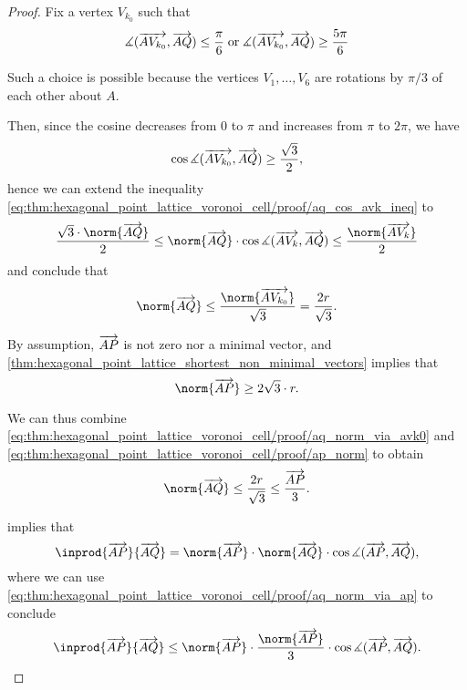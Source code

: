 \begin{proof}
  Fix a vertex \( V_{k_0} \) such that
  \begin{equation*}
    \measuredangle(\vect{AV_{k_0}}, \vect{AQ}) \leq \frac \pi 6 \T{or} \measuredangle(\vect{AV_{k_0}}, \vect{AQ}) \geq \frac {5\pi} 6
  \end{equation*}

  Such a choice is possible because the vertices \( V_1, \ldots, V_6 \) are rotations by \( \pi / 3 \) of each other about \( A \).

  Then, since the cosine decreases from \( 0 \) to \( \pi \) and increases from \( \pi \) to \( 2\pi \), we have
  \begin{equation*}
    \cos \measuredangle(\overrightarrow{AV_{k_0}}, \overrightarrow{AQ}) \geq \frac {\sqrt 3} 2,
  \end{equation*}
  hence we can extend the inequality \eqref{eq:thm:hexagonal_point_lattice_voronoi_cell/proof/aq_cos_avk_ineq} to
  \begin{equation*}
    \frac {\sqrt 3 \cdot \norm{\vect{AQ}}} 2 \leq \norm{\vect{AQ}} \cdot \cos\measuredangle(\vect{AV_k}, \vect{AQ}) \leq \frac {\norm{\vect{AV_k}}} 2
  \end{equation*}
  and conclude that
  \begin{equation}\label{eq:thm:hexagonal_point_lattice_voronoi_cell/proof/aq_norm_via_avk0}
    \norm{\vect{AQ}} \leq \frac {\norm{\vect{AV_{k_0}}}} {\sqrt 3} = \frac {2r} {\sqrt 3}.
  \end{equation}

  By assumption, \( \overrightarrow{AP} \) is not zero nor a minimal vector, and \cref{thm:hexagonal_point_lattice_shortest_non_minimal_vectors} implies that
  \begin{equation}\label{eq:thm:hexagonal_point_lattice_voronoi_cell/proof/ap_norm}
    \norm{\vect{AP}} \geq 2 \sqrt 3 \cdot r.
  \end{equation}

  We can thus combine \eqref{eq:thm:hexagonal_point_lattice_voronoi_cell/proof/aq_norm_via_avk0} and \eqref{eq:thm:hexagonal_point_lattice_voronoi_cell/proof/ap_norm} to obtain
  \begin{equation}\label{eq:thm:hexagonal_point_lattice_voronoi_cell/proof/aq_norm_via_ap}
    \norm{\vect{AQ}} \leq \frac {2r} {\sqrt 3} \leq \frac {\vect{AP}} 3.
  \end{equation}

   implies that
  \begin{equation*}
    \inprod {\vect{AP}} {\vect{AQ}}
    =
    \norm{\vect{AP}} \cdot \norm{\vect{AQ}} \cdot \cos\measuredangle(\vect{AP}, \vect{AQ}),
  \end{equation*}
  where we can use \eqref{eq:thm:hexagonal_point_lattice_voronoi_cell/proof/aq_norm_via_ap} to conclude
  \begin{equation*}
    \inprod {\vect{AP}} {\vect{AQ}}
    \leq
    \norm{\vect{AP}} \cdot \frac {\norm{\vect{AP}}} 3 \cdot \cos\measuredangle(\vect{AP}, \vect{AQ}).
  \end{equation*}


\end{proof}
